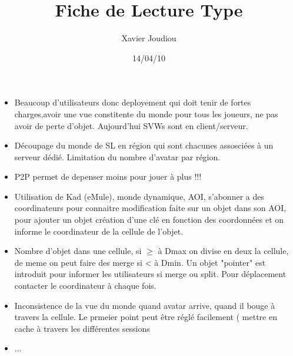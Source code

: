 \documentclass[11pt,a4paper]{article}
\title{Fiche de Lecture Type}
\author{Xavier Joudiou}
\date{14/04/10}
\begin{document}
	
  \begin{itemize}
  \renewcommand{\labelitemi}{$\Rightarrow$}
	\item Beaucoup d'utilisateurs donc deployement qui doit tenir de fortes charges,avoir une vue constitente du monde pour tous les joueurs, ne pas avoir de perte d'objet. Aujourd'hui SVWs sont en client/serveur.
	\item Découpage du monde de SL en région qui sont chacunes assosciées à un serveur dédié. Limitation du nombre d'avatar par région.
	\item P2P permet de depenser moins pour jouer à plus !!!
	\item Utilisation de Kad (eMule), monde dynamique, AOI, s'abonner a des coordinateurs pour connaitre modification faite sur un objet dans son AOI, pour ajouter un objet création d'une clé en fonction des coordonnées et on informe le coordinateur de la cellule de l'objet.
	\item Nombre d'objet dans une cellule, si $\ge$ à Dmax on divise en deux la cellule, de meme on peut faire des merge si < à Dmin. Un objet "pointer" est introduit pour informer les utilisateurs si merge ou split. Pour déplacement contacter le coordinateur à chaque fois.
	\item Inconsistence de la vue du monde quand avatar arrive, quand il bouge à travers la cellule. Le prmeier point peut être réglé facilement ( mettre en cache à travers les différentes sessions    
	\item ...
  \end{itemize}
\end{document}

